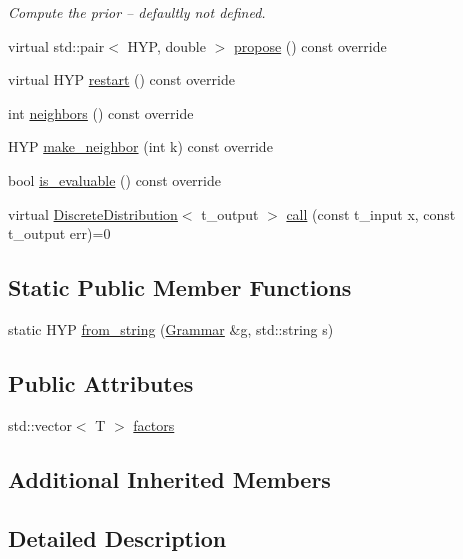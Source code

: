 \begin{DoxyCompactItemize}
\begin{DoxyCompactList}\small\item\em Compute the prior -- defaultly not defined. \end{DoxyCompactList}\item 
virtual std\+::pair$<$ H\+YP, double $>$ \hyperlink{class_lexicon_a94910b8357fe18f3ae13df8bdd56ca4e}{propose} () const override
\item 
virtual H\+YP \hyperlink{class_lexicon_a5817e922e09a2723c53eb69506f647fb}{restart} () const override
\item 
int \hyperlink{class_lexicon_abccf49d0f313b9f6e0c3ae286d13ac82}{neighbors} () const override
\item 
H\+YP \hyperlink{class_lexicon_a3d4fb7e4545267221eb38acba4d52a6b}{make\+\_\+neighbor} (int k) const override
\item 
bool \hyperlink{class_lexicon_a4928f2db73eb7d675f347429a4167820}{is\+\_\+evaluable} () const override
\item 
virtual \hyperlink{class_discrete_distribution}{Discrete\+Distribution}$<$ t\+\_\+output $>$ \hyperlink{class_lexicon_aaaff682145f9cb15f7252420fe76f111}{call} (const t\+\_\+input x, const t\+\_\+output err)=0
\end{DoxyCompactItemize}
\subsection*{Static Public Member Functions}
\begin{DoxyCompactItemize}
\item 
static H\+YP \hyperlink{class_lexicon_a1a78d0be4350165b5757201b411f94f8}{from\+\_\+string} (\hyperlink{class_grammar}{Grammar} \&g, std\+::string s)
\end{DoxyCompactItemize}
\subsection*{Public Attributes}
\begin{DoxyCompactItemize}
\item 
std\+::vector$<$ T $>$ \hyperlink{class_lexicon_a030dd03b0f892b4bda7f8bc6ff3fc7df}{factors}
\end{DoxyCompactItemize}
\subsection*{Additional Inherited Members}


\subsection{Detailed Description}
